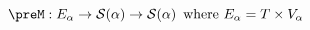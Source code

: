 \documentclass[preview]{standalone}
\begin{document}
\begin{equation*}
  \preM : E_\alpha \rightarrow \mathcal{S}(\alpha) \rightarrow \mathcal{S}(\alpha) \,
  \text{ where } E_\alpha = T \times V_\alpha
\end{equation*} 
\end{document}

